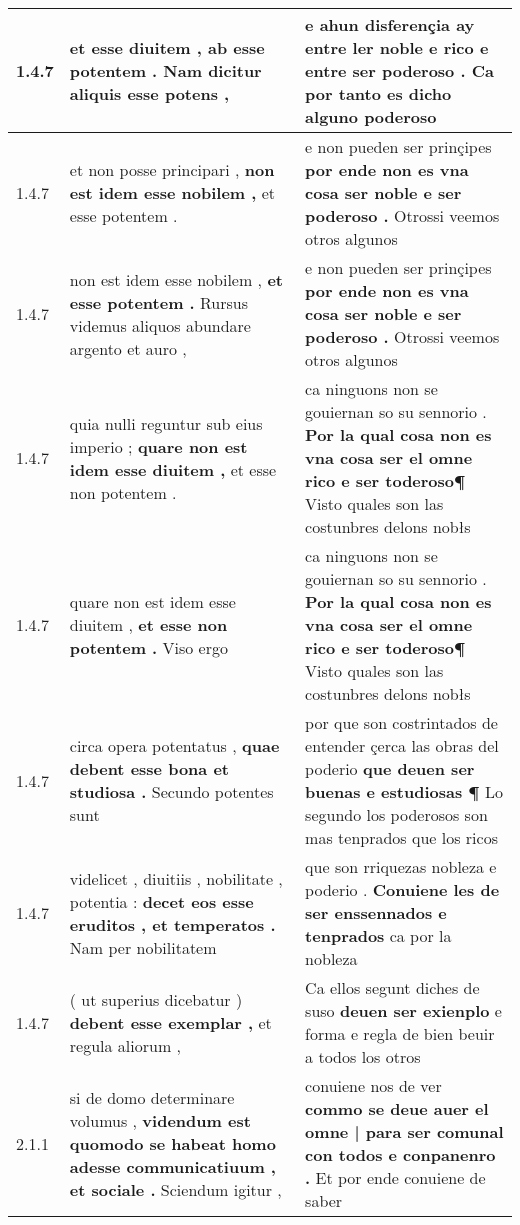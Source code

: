 \begin{tabular}{|p{1cm}|p{6.5cm}|p{6.5cm}|}
1.4.7 & et esse diuitem , \textbf{ ab esse potentem . } Nam dicitur aliquis esse potens , & e ahun disferençia ay entre ler noble e rico \textbf{ e entre ser poderoso . } Ca por tanto es dicho alguno poderoso \\\hline
1.4.7 & et non posse principari , \textbf{ non est idem esse nobilem , } et esse potentem . & e non pueden ser prinçipes \textbf{ por ende non es vna cosa ser noble e ser poderoso . } Otrossi veemos otros algunos \\\hline
1.4.7 & non est idem esse nobilem , \textbf{ et esse potentem . } Rursus videmus aliquos abundare argento et auro , & e non pueden ser prinçipes \textbf{ por ende non es vna cosa ser noble e ser poderoso . } Otrossi veemos otros algunos \\\hline
1.4.7 & quia nulli reguntur sub eius imperio ; \textbf{ quare non est idem esse diuitem , } et esse non potentem . & ca ninguons non se gouiernan so su sennorio . \textbf{ Por la qual cosa non es vna cosa ser el omne rico e ser toderoso¶ } Visto quales son las costunbres delons nobłs \\\hline
1.4.7 & quare non est idem esse diuitem , \textbf{ et esse non potentem . } Viso ergo & ca ninguons non se gouiernan so su sennorio . \textbf{ Por la qual cosa non es vna cosa ser el omne rico e ser toderoso¶ } Visto quales son las costunbres delons nobłs \\\hline
1.4.7 & circa opera potentatus , \textbf{ quae debent esse bona et studiosa . } Secundo potentes sunt & por que son costrintados de entender çerca las obras del poderio \textbf{ que deuen ser buenas e estudiosas ¶ } Lo segundo los poderosos son mas tenprados que los ricos \\\hline
1.4.7 & videlicet , diuitiis , nobilitate , potentia : \textbf{ decet eos esse eruditos , et temperatos . } Nam per nobilitatem & que son rriquezas nobleza e poderio . \textbf{ Conuiene les de ser enssennados e tenprados } ca por la nobleza \\\hline
1.4.7 & ( ut superius dicebatur ) \textbf{ debent esse exemplar , } et regula aliorum , & Ca ellos segunt diches de suso \textbf{ deuen ser exienplo } e forma e regla de bien beuir a todos los otros \\\hline
2.1.1 & si de domo determinare volumus , \textbf{ videndum est quomodo se habeat homo adesse communicatiuum , et sociale . } Sciendum igitur , & conuiene nos de ver \textbf{ commo se deue auer el omne | para ser comunal con todos e conpanenro . } Et por ende conuiene de saber \\\hline

\end{tabular}
